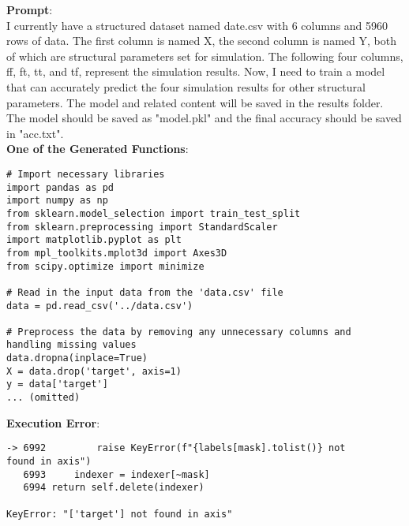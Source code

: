\onecolumn
\begin{tcolorbox}[colback=blue!5!white, colframe=blue!75!black, title=A failure case of execution error, text width=\textwidth]
\textbf{Prompt}:\\
I currently have a structured dataset named date.csv with 6 columns and 5960 rows of data. The first column is named X, the second column is named Y, both of which are structural parameters set for simulation. The following four columns, ff, ft, tt, and tf, represent the simulation results. Now, I need to train a model that can accurately predict the four simulation results for other structural parameters. The model and related content will be saved in the results folder. The model should be saved as "model.pkl" and the final accuracy should be saved in "acc.txt".\\
\textbf{One of the Generated Functions}:
\begin{verbatim}
# Import necessary libraries
import pandas as pd
import numpy as np
from sklearn.model_selection import train_test_split
from sklearn.preprocessing import StandardScaler
import matplotlib.pyplot as plt
from mpl_toolkits.mplot3d import Axes3D
from scipy.optimize import minimize

# Read in the input data from the 'data.csv' file
data = pd.read_csv('../data.csv')

# Preprocess the data by removing any unnecessary columns and 
handling missing values
data.dropna(inplace=True)
X = data.drop('target', axis=1)
y = data['target']
... (omitted)
\end{verbatim}
\textbf{Execution Error}:
\begin{verbatim}
-> 6992         raise KeyError(f"{labels[mask].tolist()} not 
found in axis")
   6993     indexer = indexer[~mask]
   6994 return self.delete(indexer)

KeyError: "['target'] not found in axis"
\end{verbatim}
\end{tcolorbox}